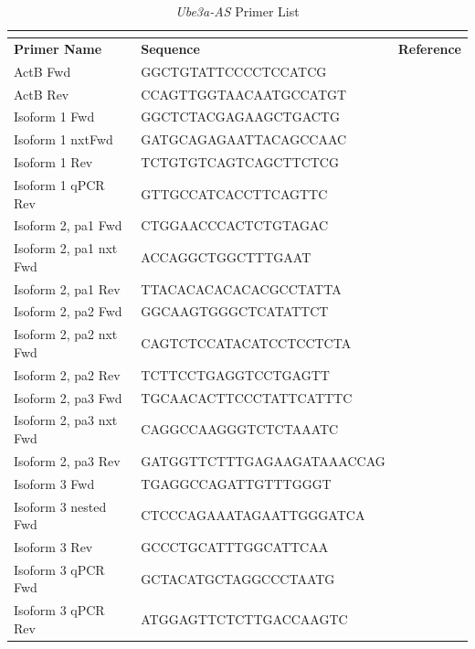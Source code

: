 \begin{longtabu} to \textwidth {X[1.5,l]X[2.5,l]X[1,c]}
  \caption{\emph{Ube3a-AS} Primer List}\\
  \label{mouse primers}\\
  \toprule
  \textbf{Primer Name}      & \textbf{Sequence}          & \textbf{Reference}\\
  \midrule
  \endhead
  ActB Fwd                  & GGCTGTATTCCCCTCCATCG       & \cite{Meng2012}\\
  ActB Rev                  & CCAGTTGGTAACAATGCCATGT     & \cite{Meng2012}\\
  \midrule
  Isoform 1 Fwd             & GGCTCTACGAGAAGCTGACTG      & \\
  Isoform 1 nxt\footnotemark Fwd      & GATGCAGAGAATTACAGCCAAC     & \\
  Isoform 1 Rev             & TCTGTGTCAGTCAGCTTCTCG      & \\
  Isoform 1 qPCR Rev        & GTTGCCATCACCTTCAGTTC       & \\
  Isoform 2, pa1 Fwd        & CTGGAACCCACTCTGTAGAC       & \\
  Isoform 2, pa1 nxt Fwd    & ACCAGGCTGGCTTTGAAT         & \\
  Isoform 2, pa1 Rev        & TTACACACACACACGCCTATTA     & \\
  Isoform 2, pa2 Fwd        & GGCAAGTGGGCTCATATTCT       & \\
  Isoform 2, pa2 nxt Fwd    & CAGTCTCCATACATCCTCCTCTA    & \\
  Isoform 2, pa2 Rev        & TCTTCCTGAGGTCCTGAGTT       & \\
  Isoform 2, pa3 Fwd        & TGCAACACTTCCCTATTCATTTC    & \\
  Isoform 2, pa3 nxt Fwd    & CAGGCCAAGGGTCTCTAAATC      & \\
  Isoform 2, pa3 Rev        & GATGGTTCTTTGAGAAGATAAACCAG & \\
  Isoform 3 Fwd             & TGAGGCCAGATTGTTTGGGT       & \\
  Isoform 3 nested Fwd      & CTCCCAGAAATAGAATTGGGATCA   & \\
  Isoform 3 Rev             & GCCCTGCATTTGGCATTCAA       & \\
  Isoform 3 qPCR Fwd        & GCTACATGCTAGGCCCTAATG      & \\
  Isoform 3 qPCR Rev        & ATGGAGTTCTCTTGACCAAGTC     & \\

\end{longtabu}
